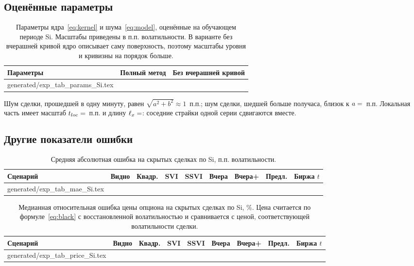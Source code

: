 \documentclass{article}
\makeatletter
\newcommand{\rows}[1]{\@@input generated/#1 }
\makeatother
\begin{document}
\subsection{Оценённые параметры}

\begin{table}[h]
\caption{Параметры ядра~\eqref{eq:kernel} и шума~\eqref{eq:model}, оценённые на обучающем периоде Si. Масштабы приведены в п.п. волатильности. В варианте без вчерашней кривой ядро описывает саму поверхность, поэтому масштабы уровня и кривизны на порядок больше.}\label{tab:params}
\centering\footnotesize
\begin{tabular}{lll}
\toprule
Параметры & Полный метод & Без вчерашней кривой \\
\midrule
\rows{exp_tab_params_Si.tex}
\bottomrule
\end{tabular}
\end{table}

Шум сделки, прошедшей в одну минуту, равен $\sqrt{a^2+b^2}\approx 1$~п.п.; шум сделки, шедшей больше получаса, близок к $a=\E{Si/param/gp/a}$~п.п. Локальная часть имеет масштаб $t_{loc}=\E{Si/param/gp/tloc}$~п.п. и длину $\ell_x=\E{Si/param/gp/ell_x}$: соседние страйки одной серии сдвигаются вместе.

\subsection{Другие показатели ошибки}

\begin{table}[h]
\caption{Средняя абсолютная ошибка на скрытых сделках по Si, п.п. волатильности.}\label{tab:mae}
\centering\footnotesize
\setlength{\tabcolsep}{4pt}
\begin{tabular}{lrrrrrrrr}
\toprule
Сценарий & Видно & Квадр. & SVI & SSVI & Вчера & Вчера+ & Предл. & Биржа $t$ \\
\midrule
\rows{exp_tab_mae_Si.tex}
\bottomrule
\end{tabular}
\end{table}

\begin{table}[h]
\caption{Медианная относительная ошибка цены опциона на скрытых сделках по Si, \%. Цена считается по формуле~\eqref{eq:black} с восстановленной волатильностью и сравнивается с ценой, соответствующей волатильности сделки.}\label{tab:price}
\centering\footnotesize
\setlength{\tabcolsep}{4pt}
\begin{tabular}{lrrrrrrrr}
\toprule
Сценарий & Видно & Квадр. & SVI & SSVI & Вчера & Вчера+ & Предл. & Биржа $t$ \\
\midrule
\rows{exp_tab_price_Si.tex}
\bottomrule
\end{tabular}
\end{table}
\end{document}
